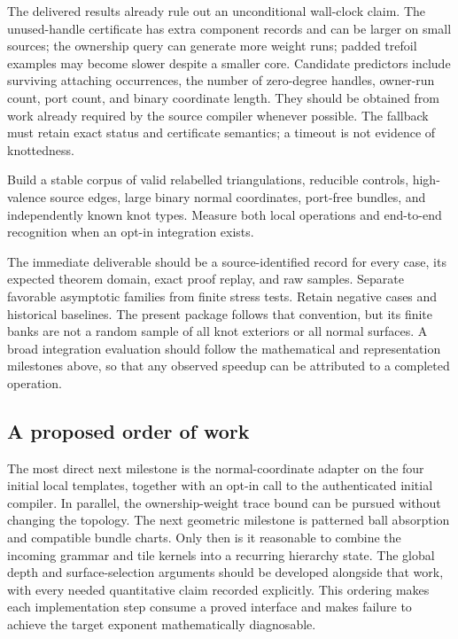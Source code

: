 The delivered results already rule out an unconditional wall-clock claim.
The unused-handle certificate has extra component records and can be
larger on small sources; the ownership query can generate more weight
runs; padded trefoil examples may become slower despite a smaller core.
Candidate predictors include surviving attaching occurrences, the number
of zero-degree handles, owner-run count, port count, and binary coordinate
length.  They should be obtained from work already required by the source
compiler whenever possible.  The fallback must retain exact status and
certificate semantics; a timeout is not evidence of knottedness.

\begin{problem}
Build a stable corpus of valid relabelled triangulations, reducible
controls, high-valence source edges, large binary normal coordinates,
port-free bundles, and independently known knot types.  Measure both
local operations and end-to-end recognition when an opt-in integration
exists.
\end{problem}

The immediate deliverable should be a source-identified record for every
case, its expected theorem domain, exact proof replay, and raw samples.
Separate favorable asymptotic families from finite stress tests.  Retain
negative cases and historical baselines.  The present package follows
that convention, but its finite banks are not a random sample of all
knot exteriors or all normal surfaces.  A broad integration evaluation
should follow the mathematical and representation milestones above,
so that any observed speedup can be attributed to a completed operation.

\subsection{A proposed order of work}

The most direct next milestone is the normal-coordinate adapter on the
four initial local templates, together with an opt-in call to the
authenticated initial compiler.  In parallel, the ownership-weight
trace bound can be pursued without changing the topology.  The next
geometric milestone is patterned ball absorption and compatible bundle
charts.  Only then is it reasonable to combine the incoming grammar and
tile kernels into a recurring hierarchy state.  The global depth and
surface-selection arguments should be developed alongside that work,
with every needed quantitative claim recorded explicitly.  This ordering
makes each implementation step consume a proved interface and makes
failure to achieve the target exponent mathematically diagnosable.
